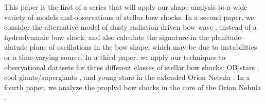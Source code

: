 This paper is the first of a series that will apply our shape analysis
to a wide variety of models and observations of stellar bow shocks.
In a second paper, %
we consider the alternative model of dusty radiation-driven bow wave
\citep{Ochsendorf:2014a}, instead of a hydrodynamic bow shock, and
also calculate the signature in the planitude--alatude plane of
oscillations in the bow shape, which may be due to instabilities or a
time-varying source.  In a third paper, %
we apply our techniques to observational datasets for three different
classes of stellar bow shocks: OB stars \citep{Kobulnicky:2016a}, cool
giants/supergiants \citep{Cox:2012a}, and young stars in the extended
Orion Nebula \citep{Henney:2013a}.  In a fourth paper,
we analyze the proplyd bow shocks in the core of the Orion Nebula
\citep{Garcia-Arredondo:2001a}.



